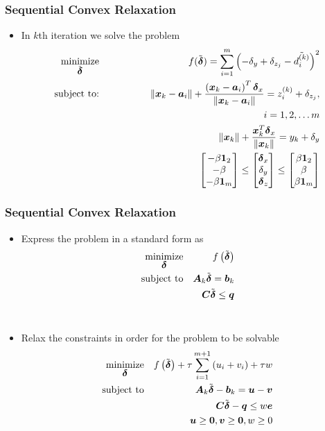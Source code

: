 \documentclass [t] {beamer} %
\begin{document}
\begin{frame} %
\frametitle{Sequential Convex Relaxation}
\phantom{m}
\begin{itemize}
\item
In $k$th iteration we solve the problem
\begin{eqnarray} 
\nonumber
\mathop{\mbox{minimize}}_{\tilde{\mbox{\boldmath${\delta}$}}}& &f(\tilde{\mbox{\boldmath${\delta}$}}) = \sum^m_{i=1}\left(-\delta_y + \delta_{z_{j}} - \tilde{d^{(k)}_i}\right)^2\\
\nonumber
\mbox{subject to:}& &\|\mbox{\boldmath$x$}_k - \mbox{\boldmath$a$}_i\| + \frac{\left(\mbox{\boldmath$x$}_{k} - \mbox{\boldmath$a$}_i\right)^T\mbox{\boldmath${\delta}$}_x}{\|\mbox{\boldmath$x$}_k - \mbox{\boldmath$a$}_i\| } = z_i^{(k)} + \delta_{z_{j}}, \\
\nonumber
& &\qquad \qquad \qquad \qquad \qquad \qquad \qquad  \qquad i = 1, 2, \ldots m \\
\nonumber
& &\|\mbox{\boldmath$x$}_k\| + \frac{\mbox{\boldmath$x$}_k^T\mbox{\boldmath${\delta}$}_x}{\|\mbox{\boldmath$x$}_k\|} = y_k + \delta_y \\
\nonumber
& &\begin{bmatrix}
-\beta\mbox{\boldmath$1$}_2 \\
-\beta \\
-\beta\mbox{\boldmath$1$}_m
\end{bmatrix} \leq \begin{bmatrix}
\mbox{\boldmath${\delta}$}_x \\
\delta_y \\
\mbox{\boldmath${\delta}$}_z
\end{bmatrix} \leq \begin{bmatrix}
\beta\mbox{\boldmath$1$}_2 \\
\beta \\
\beta\mbox{\boldmath$1$}_m
\end{bmatrix}
\end{eqnarray}

\end{itemize}
\end{frame}

\begin{frame} %
\frametitle{Sequential Convex Relaxation}
\begin{itemize}
\item
Express the problem  in a standard form as
\begin{eqnarray}
\nonumber
\mathop{\mbox{minimize}}_{\mbox{\boldmath${\delta}$}}& &f\left(\tilde{\mbox{\boldmath${\delta}$}}\right) \\
\nonumber
\mbox{subject to}& &\mbox{\boldmath$A$}_k\tilde{\mbox{\boldmath${\delta}$}} = \mbox{\boldmath$b$}_k \\
\nonumber
& &\mbox{\boldmath$C$}\tilde{\mbox{\boldmath${\delta}$}} \leq \mbox{\boldmath$q$}
\end{eqnarray}
\\
\item
Relax the constraints  in order for the problem to be solvable
\begin{eqnarray} 
\nonumber
\mathop{\mbox{minimize}}_{\mbox{\boldmath${\delta}$}}& &f\left(\tilde{\mbox{\boldmath${\delta}$}}\right) + \tau\sum_{i=1}^{m+1} \left(u_i + v_i\right) +\tau w\\
\nonumber
\mbox{subject to}& &\mbox{\boldmath$A$}_k\tilde{\mbox{\boldmath${\delta}$}} - \mbox{\boldmath$b$}_k = \mbox{\boldmath$u$} - \mbox{\boldmath$v$} \\
\nonumber
& &\mbox{\boldmath$C$}\tilde{\mbox{\boldmath${\delta}$}} - \mbox{\boldmath$q$} \leq w\mbox{\boldmath$e$} \\
\nonumber
& & \mbox{\boldmath$u$} \geq \mbox{\boldmath${0}$}, \mbox{\boldmath$v$} \geq \mbox{\boldmath${0}$}, w \geq 0
\end{eqnarray}
\end{itemize}
\end{frame}
\end{document}
